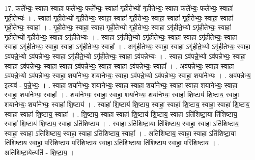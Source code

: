 \documentclass[17pt]{extarticle}
\begin{document}
17. फले᳚भ्यः॒ स्वाहा॒ स्वाहा॒ फले᳚भ्यः॒ फले᳚भ्यः॒ स्वाहा॑ गृही॒तेभ्यो॑ गृही॒तेभ्यः॒ स्वाहा॒ फले᳚भ्यः॒ फले᳚भ्यः॒ स्वाहा॑ गृही॒तेभ्यः॑ । . स्वाहा॑ गृही॒तेभ्यो॑ गृही॒तेभ्यः॒ स्वाहा॒ स्वाहा॑ गृही॒तेभ्यः॒ स्वाहा॒ स्वाहा॑ गृही॒तेभ्यः॒ स्वाहा॒ स्वाहा॑ गृही॒तेभ्यः॒ स्वाहा᳚ । . गृ॒ही॒तेभ्यः॒ स्वाहा॒ स्वाहा॑ गृही॒तेभ्यो॑ गृही॒तेभ्यः॒ स्वाहा ऽगृ॑हीते॒भ्यो ऽगृ॑हीतेभ्यः॒ स्वाहा॑ गृही॒तेभ्यो॑ गृही॒तेभ्यः॒ स्वाहा ऽगृ॑हीतेभ्यः । . स्वाहा ऽगृ॑हीते॒भ्यो ऽगृ॑हीतेभ्यः॒ स्वाहा॒ स्वाहा ऽगृ॑हीतेभ्यः॒ स्वाहा॒ स्वाहा ऽगृ॑हीतेभ्यः॒ स्वाहा॒ स्वाहा ऽगृ॑हीतेभ्यः॒ स्वाहा᳚ । . अगृ॑हीतेभ्यः॒ स्वाहा॒ स्वाहा ऽगृ॑हीते॒भ्यो ऽगृ॑हीतेभ्यः॒ स्वाहा ऽव॑पन्ने॒भ्यो ऽव॑पन्नेभ्यः॒ स्वाहा ऽगृ॑हीते॒भ्यो ऽगृ॑हीतेभ्यः॒ स्वाहा ऽव॑पन्नेभ्यः । . स्वाहा ऽव॑पन्ने॒भ्यो ऽव॑पन्नेभ्यः॒ स्वाहा॒ स्वाहा ऽव॑पन्नेभ्यः॒ स्वाहा॒ स्वाहा ऽव॑पन्नेभ्यः॒ स्वाहा॒ स्वाहा ऽव॑पन्नेभ्यः॒ स्वाहा᳚ । . अव॑पन्नेभ्यः॒ स्वाहा॒ स्वाहा ऽव॑पन्ने॒भ्यो ऽव॑पन्नेभ्यः॒ स्वाहा॒ शया॑नेभ्यः॒ शया॑नेभ्यः॒ स्वाहा ऽव॑पन्ने॒भ्यो ऽव॑पन्नेभ्यः॒ स्वाहा॒ शया॑नेभ्यः । . अव॑पन्नेभ्य॒ इत्यव॑ - प॒न्ने॒भ्यः॒ । . स्वाहा॒ शया॑नेभ्यः॒ शया॑नेभ्यः॒ स्वाहा॒ स्वाहा॒ शया॑नेभ्यः॒ स्वाहा॒ स्वाहा॒ शया॑नेभ्यः॒ स्वाहा॒ स्वाहा॒ शया॑नेभ्यः॒ स्वाहा᳚ । . शया॑नेभ्यः॒ स्वाहा॒ स्वाहा॒ शया॑नेभ्यः॒ शया॑नेभ्यः॒ स्वाहा॑ शि॒ष्टाय॑ शि॒ष्टाय॒ स्वाहा॒ शया॑नेभ्यः॒ शया॑नेभ्यः॒ स्वाहा॑ शि॒ष्टाय॑ । . स्वाहा॑ शि॒ष्टाय॑ शि॒ष्टाय॒ स्वाहा॒ स्वाहा॑ शि॒ष्टाय॒ स्वाहा॒ स्वाहा॑ शि॒ष्टाय॒ स्वाहा॒ स्वाहा॑ शि॒ष्टाय॒ स्वाहा᳚ । . शि॒ष्टाय॒ स्वाहा॒ स्वाहा॑ शि॒ष्टाय॑ शि॒ष्टाय॒ स्वाहा ऽति॑शिष्टा॒या ति॑शिष्टाय॒ स्वाहा॑ शि॒ष्टाय॑ शि॒ष्टाय॒ स्वाहा ऽति॑शिष्टाय । . स्वाहा ऽति॑शिष्टा॒या ति॑शिष्टाय॒ स्वाहा॒ स्वाहा ऽति॑शिष्टाय॒ स्वाहा॒ स्वाहा ऽति॑शिष्टाय॒ स्वाहा॒ स्वाहा ऽति॑शिष्टाय॒ स्वाहा᳚ । . अति॑शिष्टाय॒ स्वाहा॒ स्वाहा ऽति॑शिष्टा॒या ति॑शिष्टाय॒ स्वाहा॒ परि॑शिष्टाय॒ परि॑शिष्टाय॒ स्वाहा ऽति॑शिष्टा॒या ति॑शिष्टाय॒ स्वाहा॒ परि॑शिष्टाय । . अति॑शिष्टा॒येत्यति॑ - शि॒ष्टा॒य॒ । \newline
\end{document}

